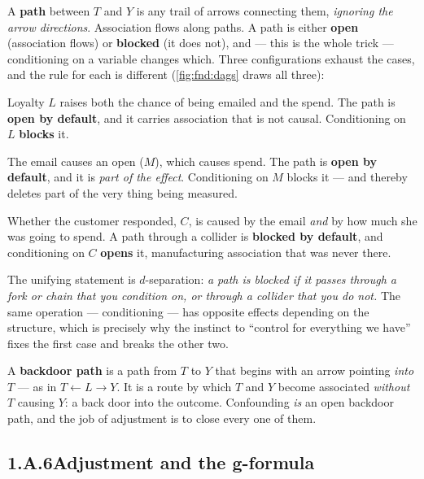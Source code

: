 A \textbf{path} between $T$ and $Y$ is any trail of arrows connecting them, \emph{ignoring the
arrow directions}. Association flows along paths. A path is either \textbf{open} (association
flows) or \textbf{blocked} (it does not), and --- this is the whole trick --- conditioning on a
variable changes which. Three configurations exhaust the cases, and the rule for each is different
(\cref{fig:fnd:dags} draws all three):
%
\begin{description}[leftmargin=*, style=nextline]
  \item[Fork (a common cause): $T \leftarrow L \rightarrow Y$.]
    Loyalty $L$ raises both the chance of being emailed and the spend. The path is \textbf{open by
    default}, and it carries association that is not causal. Conditioning on $L$ \textbf{blocks} it.
  \item[Chain (a mediator): $T \rightarrow M \rightarrow Y$.]
    The email causes an open ($M$), which causes spend. The path is \textbf{open by default}, and
    it is \emph{part of the effect}. Conditioning on $M$ blocks it --- and thereby deletes part of
    the very thing being measured.
  \item[Collider (a common effect): $T \rightarrow C \leftarrow Y$.]
    Whether the customer responded, $C$, is caused by the email \emph{and} by how much she was
    going to spend. A path through a collider is \textbf{blocked by default}, and conditioning on
    $C$ \textbf{opens} it, manufacturing association that was never there.
\end{description}
%
The unifying statement is $d$-separation: \emph{a path is blocked if it passes through a fork or
chain that you condition on, or through a collider that you do not.} The same operation ---
conditioning --- has opposite effects depending on the structure, which is precisely why the
instinct to ``control for everything we have'' fixes the first case and breaks the other two.

A \textbf{backdoor path} is a path from $T$ to $Y$ that begins with an arrow pointing \emph{into}
$T$ --- as in $T \leftarrow L \rightarrow Y$. It is a route by which $T$ and $Y$ become associated
\emph{without} $T$ causing $Y$: a back door into the outcome. Confounding \emph{is} an open
backdoor path, and the job of adjustment is to close every one of them.

\subsection*{1.A.6\quad Adjustment and the g-formula}

